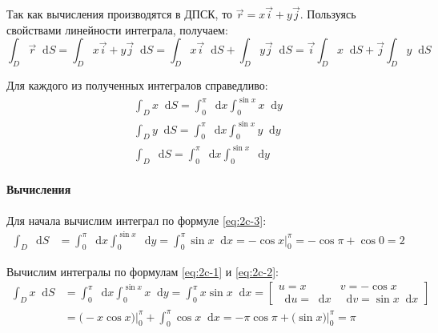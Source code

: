 \documentclass[a4paper,12pt]{article}
\newcommand*\diff{\mathop{}\!\mathrm{d}}
\begin{document}
Так как вычисления производятся в ДПСК, то
\(\vec{r} = x \vec{i} + y \vec{j}\).
Пользуясь свойствами линейности интеграла, получаем:
\begin{equation} \label{eq:2c-main-1}
  \int_{D} \vec{r} \diff S
    = \int_{D} x \vec{i} + y \vec{j} \diff S
    = \int_{D} x \vec{i} \diff S + \int_{D} y \vec{j} \diff S
    = \vec{i} \int_{D} x \diff S + \vec{j} \int_{D} y \diff S
\end{equation}

Для каждого из полученных интегралов справедливо:
\begin{align}
  \int_{D} x \diff S = \int_{0}^{\pi} \diff x \int_{0}^{\sin x} x \diff y
  \label{eq:2c-1} \\
  \int_{D} y \diff S = \int_{0}^{\pi} \diff x \int_{0}^{\sin x} y \diff y
  \label{eq:2c-2} \\
  \int_{D} \diff S = \int_{0}^{\pi} \diff x \int_{0}^{\sin x} \diff y
  \label{eq:2c-3}
\end{align}

\paragraph{Вычисления}

Для начала вычислим интеграл по формуле \ref{eq:2c-3}:
\begin{equation} \label{eq:2c-3-calc}
\begin{split}
  \int_{D} \diff S
    &= \int_{0}^{\pi} \diff x \int_{0}^{\sin x} \diff y
     = \int_{0}^{\pi} \sin x \diff x
     = - \cos x \bigg\rvert_{0}^{\pi}
     = - \cos \pi + \cos 0 = 2
\end{split}
\end{equation}

Вычислим интегралы по формулам \ref{eq:2c-1} и \ref{eq:2c-2}:
\begin{equation} \label{eq:2c-1-calc}
\begin{split}
  \int_{D} x \diff S
  &= \int_{0}^{\pi} \diff x \int_{0}^{\sin x} x \diff y
   = \int_{0}^{\pi} x \sin x \diff x
   =
    \begin{bmatrix}
      u = x & v = - \cos x \\
      \diff u = \diff x & \diff v = \sin x \diff x
    \end{bmatrix} \\
  &= \bigg( -x \cos x \bigg) \bigg\rvert_{0}^{\pi}
   + \int_{0}^{\pi} \cos x \diff x
   = - \pi \cos\pi + \bigg( \sin x \bigg) \bigg\rvert_{0}^{\pi}
   = \pi
\end{split}
\end{equation}
\end{document}
